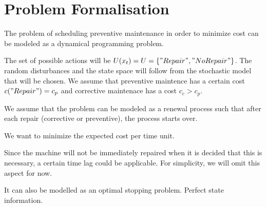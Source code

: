 \section{Problem Formalisation}
The problem of scheduling preventive maintenance in order to minimize cost can be modeled as a dynamical programming problem. 

The set of possible actions will be $U(x_t)=U=\{"Repair", "No Repair"\}$. The random disturbances and the state space will follow from the stochastic model that will be chosen. We assume that preventive maintence has a certain cost $c("Repair")=c_p$ and corrective maintenace has a cost $c_c>c_p$.

We assume that the problem can be modeled as a renewal process such that after each repair (corrective or preventive), the process starts over.

We want to minimize the expected cost per time unit.

Since the machine will not be immediately repaired when it is decided that this is necessary, a certain time lag could be applicable. For simplicity, we will omit this aspect for now.

It can also be modelled as an optimal stopping problem.
Perfect state information.

